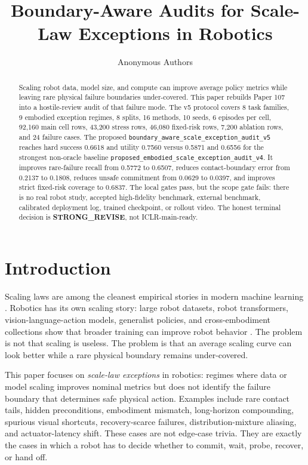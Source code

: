 \documentclass{article}
\title{Boundary-Aware Audits for Scale-Law Exceptions in Robotics}
\author{Anonymous Authors}
\begin{document}
\maketitle

\begin{abstract}
Scaling robot data, model size, and compute can improve average policy metrics while leaving rare physical failure boundaries under-covered. This paper rebuilds Paper 107 into a hostile-review audit of that failure mode. The v5 protocol covers 8 task families, 9 embodied exception regimes, 8 splits, 16 methods, 10 seeds, 6 episodes per cell, 92,160 main cell rows, 43,200 stress rows, 46,080 fixed-risk rows, 7,200 ablation rows, and 24 failure cases. The proposed \texttt{boundary\_aware\_scale\_exception\_audit\_v5} reaches hard success 0.6618 and utility 0.7560 versus 0.5871 and 0.6556 for the strongest non-oracle baseline \texttt{proposed\_embodied\_scale\_exception\_audit\_v4}. It improves rare-failure recall from 0.5772 to 0.6507, reduces contact-boundary error from 0.2137 to 0.1808, reduces unsafe commitment from 0.0629 to 0.0397, and improves strict fixed-risk coverage to 0.6837. The local gates pass, but the scope gate fails: there is no real robot study, accepted high-fidelity benchmark, external benchmark, calibrated deployment log, trained checkpoint, or rollout video. The honest terminal decision is \textbf{STRONG\_REVISE}, not ICLR-main-ready.
\end{abstract}

\section{Introduction}
Scaling laws are among the cleanest empirical stories in modern machine learning \citep{kaplan2020scaling,hoffmann2022training,reed2022gato,brohan2022rt1,brohan2023rt2}. Robotics has its own scaling story: large robot datasets, robot transformers, vision-language-action models, generalist policies, and cross-embodiment collections show that broader training can improve robot behavior \citep{brohan2022rt1,brohan2023rt2,openx2023rtx,octo2024,khazatsky2024droid,lynch2023interactive}. The problem is not that scaling is useless. The problem is that an average scaling curve can look better while a rare physical boundary remains under-covered.

This paper focuses on \emph{scale-law exceptions} in robotics: regimes where data or model scaling improves nominal metrics but does not identify the failure boundary that determines safe physical action. Examples include rare contact tails, hidden preconditions, embodiment mismatch, long-horizon compounding, spurious visual shortcuts, recovery-scarce failures, distribution-mixture aliasing, and actuator-latency shift. These cases are not edge-case trivia. They are exactly the cases in which a robot has to decide whether to commit, wait, probe, recover, or hand off.
\end{document}
